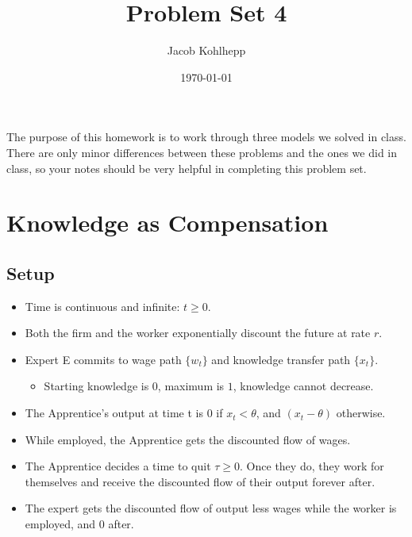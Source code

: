 \documentclass{article}
\title{Problem Set 4}
\author{Jacob Kohlhepp}
\date{\today}
\begin{document}
\maketitle

The purpose of this homework is to work through three models we solved in class. There are only minor differences between these problems and the ones we did in class, so your notes should be very helpful in completing this problem set.

\section{Knowledge as Compensation}

\subsection{Setup}
    \begin{itemize}
        \item Time is continuous and infinite: $t\geq 0$.
        \item Both the firm and the worker exponentially discount the future at rate $r$.
        \item Expert E commits to wage path $\{w_t\}$ and knowledge transfer path $\{x_t\}$.
        \begin{itemize}
            \item Starting knowledge is $0$, maximum is $1$, knowledge cannot decrease.
        \end{itemize}
        \item The Apprentice's output at time t is $0$ if $x_t<\theta $, and $(x_t-\theta)$ otherwise.
        \item While employed, the Apprentice gets the discounted flow of wages.
            \item  The Apprentice decides a time to quit $\tau\geq 0$. Once they do, they work for themselves and receive the discounted flow of their output forever after.
           \item The expert gets the discounted flow of output less wages while the worker is employed, and 0 after.

    \end{itemize}
\end{document}
